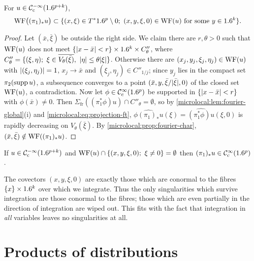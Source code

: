\begin{proposition}[Projection]\label{microlocal:prop:projection}
  For $u\in\mathcal{C}^{-\infty}_{\mathrm{c}}(1.6^{p+k})$,
  \begin{equation*}
    \operatorname{WF}\bigl((\pi_1)_*u\bigr)\subset\{(x,\xi)\in T^*1.6^p\setminus0;\
    (x,y,\xi,0)\in\operatorname{WF}(u)\text{ for some }y\in1.6^k\}.
  \end{equation*}
\end{proposition}
\begin{proof}
  Let $(\bar x,\bar\xi)$ be outside the right side. We claim there are
  $r,\theta>0$ such that $\operatorname{WF}(u)$ does not meet
  $\{\lvert x-\bar x\rvert<r\}\times1.6^k\times C''_\theta$, where
  $C''_\theta=\{(\xi,\eta);\ \xi\in\overline{V_\theta(\bar\xi)},\
  \abs\eta\le\theta\abs\xi\}$. Otherwise there are
  $(x_j,y_j,\xi_j,\eta_j)\in\operatorname{WF}(u)$ with $\lvert (\xi_j,\eta_j)\rvert=1$,
  $x_j\to\bar x$ and $(\xi_j,\eta_j)\in C''_{1/j}$; since $y_j$ lies in the
  compact set $\pi_2(\operatorname{supp} u)$, a subsequence converges to a point
  $(\bar x,y,\bar\xi/\lvert \bar\xi\rvert,0)$ of the closed set $\operatorname{WF}(u)$, a
  contradiction. Now let $\phi\in\mathcal{C}^\infty_{\mathrm{c}}(1.6^p)$ be supported in $\{\lvert x-\bar
  x\rvert<r\}$ with $\phi(\bar x)\ne0$. Then
  $\Sigma_{\mathrm{fr}}((\pi_1^*\phi)u)\cap C''_\theta=\emptyset$, so by
  \cref{microlocal:lem:fourier-global}(i) and
  \eqref{microlocal:eq:projection-ft},
  $\widehat{\phi(\pi_1)_*u}(\xi)=\widehat{(\pi_1^*\phi)u}(\xi,0)$ is rapidly
  decreasing on $V_\theta(\bar\xi)$. By \cref{microlocal:prop:fourier-char},
  $(\bar x,\bar\xi)\notin\operatorname{WF}((\pi_1)_*u)$.
\end{proof}

\begin{corollary}\label{microlocal:cor:projection-smooth}
  If $u\in\mathcal{C}^{-\infty}_{\mathrm{c}}(1.6^{p+k})$ and $\WF(u)\cap\{(x,y,\xi,0);\ \xi\ne0\}=\emptyset$
  then $(\pi_1)_*u\in\mathcal{C}^\infty_{\mathrm{c}}(1.6^p)$.
\end{corollary}

The covectors $(x,y,\xi,0)$ are exactly those which are conormal to the
fibres $\{x\}\times1.6^k$ over which we integrate. Thus the only singularities
which survive integration are those conormal to the fibres; those which are
even partially in the direction of integration are wiped out. This fits with
the fact that integration in \emph{all} variables leaves no singularities
at all.

\section{Products of distributions}\label{microlocal:sec:products}

